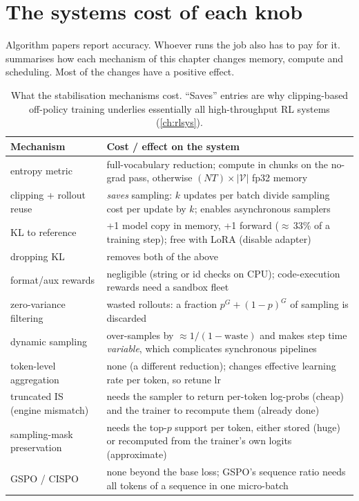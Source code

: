 \section{The systems cost of each knob}\label{sec:grpo2:costs}

Algorithm papers report accuracy. Whoever runs the job also has to pay for it.
 summarises how each mechanism of this chapter changes memory, compute
and scheduling. Most of the changes have a positive effect.

\begin{table}[ht]
\centering\small
\begin{tabularx}{\linewidth}{@{}lX@{}}
\toprule
Mechanism & Cost / effect on the system\\
\midrule
entropy metric & full-vocabulary reduction; compute in chunks on the no-grad pass, otherwise
$(NT)\times|\mathcal V|$ fp32 memory\\
clipping + rollout reuse & \emph{saves} sampling: $k$ updates per batch divide sampling cost per
update by $k$; enables asynchronous samplers\\
KL to reference & +1 model copy in memory, +1 forward ($\approx$\,33\% of a training step);
free with LoRA (disable adapter)\\
dropping KL & removes both of the above\\
format/aux rewards & negligible (string or id checks on CPU); code-execution rewards need a
sandbox fleet\\
zero-variance filtering & wasted rollouts: a fraction $p^G+(1-p)^G$ of sampling is discarded\\
dynamic sampling & over-samples by $\approx1/(1-\text{waste})$ and makes step time
\emph{variable}, which complicates synchronous pipelines\\
token-level aggregation & none (a different reduction); changes effective learning rate per
token, so retune lr\\
truncated IS (engine mismatch) & needs the sampler to return per-token log-probs (cheap) and
the trainer to recompute them (already done)\\
sampling-mask preservation & needs the top-$p$ support per token, either stored (huge) or
recomputed from the trainer's own logits (approximate)\\
GSPO / CISPO & none beyond the base loss; GSPO's sequence ratio needs all tokens of a sequence
in one micro-batch\\
\bottomrule
\end{tabularx}
\caption{What the stabilisation mechanisms cost. ``Saves'' entries are why clipping-based
off-policy training underlies essentially all high-throughput RL systems (\cref{ch:rlsys}).}
\label{tab:grpo2:costs}
\end{table}

